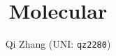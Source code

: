 \documentclass[12pt]{article}
\title{Molecular}		%
\author{Qi Zhang (UNI: \texttt{qz2280})}								%
\date{}											%
\begin{document}



\tableofcontents
\newpage





\nocite{dufty1986molecular}
\end{document}
